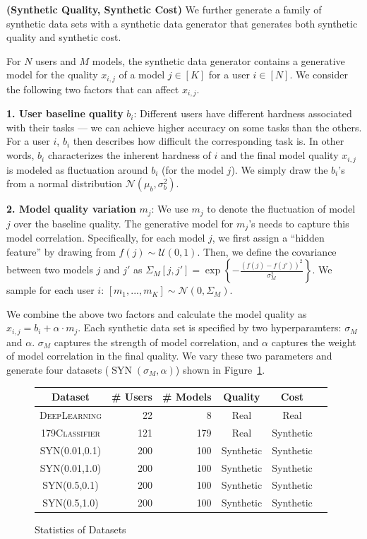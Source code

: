 \documentclass[letterpaper]{vldb}
\DeclareMathOperator{\SYN}{SYN}
\begin{document}
\vspace{0.5em}
\noindent
{\bf (Synthetic Quality, Synthetic Cost)}
We further generate a family of 
synthetic data sets with a 
synthetic data generator that generates
both synthetic quality and synthetic cost.

For $N$ users and $M$ models, the synthetic
data generator contains a generative model 
for the quality $x_{i,j}$ of a 
model $j\in[K]$ for a user $i\in[N]$.
We consider the following two factors that can affect $x_{i,j}$.

\noindent
{\bf 1. User baseline quality} $b_i$: Different 
users have different hardness associated with their tasks --- we can achieve higher accuracy on some tasks than the others.
For a user $i$, $b_i$ then describes how difficult the corresponding task is.
In other words, $b_i$ characterizes the inherent hardness of $i$ and the final model quality $x_{i,j}$ is modeled as fluctuation around $b_i$ (for the model $j$). We simply draw the $b_i$'s from a normal distribution $\mathcal{N}(\mu_b,\sigma_b^2)$.


\noindent
{\bf 2. Model quality variation} $m_j$: 
We use $m_j$ to denote the fluctuation of model $j$
over the baseline quality. The generative model for 
$m_j$'s needs to capture this model correlation.
Specifically, for each model $j$, we first assign a 
``hidden feature'' by drawing
from $f(j)\sim\mathcal{U}(0,1)$.
Then, we define the covariance between 
two models $j$ and $j'$ as 
$\Sigma_M[j, j']=\exp \left\{-\frac{(f(j) - f(j'))^2}{\sigma_M^2} \right\}$. We sample
for each user $i$: $
[m_1,...,m_K] \sim \mathcal{N}(0, \Sigma_M)$.

We combine the above two factors and 
calculate the model quality as $x_{i,j} = b_i + \alpha\cdot m_j$. Each synthetic data
set is specified by two hyperparamters:
$\sigma_M$ and $\alpha$. $\sigma_M$ captures
the strength of model correlation, and $\alpha$
captures the weight of model correlation in
the final quality. We vary these two
parameters and generate four datasets
($\SYN(\sigma_M, \alpha)$) shown in Figure~\ref{tab:datasets}.


\begin{figure}
\centering
\small
\begin{tabular}{c | r r | c c c}
\hline
{\bf Dataset} & {\bf \# Users} & {\bf \# Models} & {\bf Quality} & {\bf Cost} \\
\hline
\textsc{DeepLearning} & 22 & 8 & Real & Real \\
\textsc{179Classifier} & 121 & 179 & Real & Synthetic \\
\hline
\textsc{SYN(0.01,0.1)} & 200 & 100 & Synthetic & Synthetic \\
\textsc{SYN(0.01,1.0)} & 200 & 100 & Synthetic & Synthetic \\
\textsc{SYN(0.5,0.1)} & 200 & 100 & Synthetic & Synthetic \\
\textsc{SYN(0.5,1.0)} & 200 & 100 & Synthetic & Synthetic \\
\hline
\end{tabular}
\vspace{-1em}
\caption{Statistics of Datasets}
\label{tab:datasets}
\vspace{-1em}
\end{figure}
\end{document}
